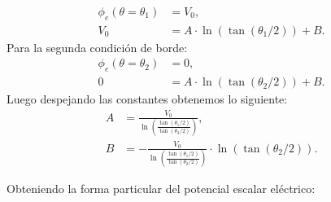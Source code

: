 \documentclass[
  11pt,
  letterpaper,
   addpoints,
   answers
  ]{exam}
\begin{document}
\begin{questions}
\begin{solution}
\begin{enumerate}
\begin{equation}
            \begin{aligned}
                \phi_{e}(\theta = \theta_{1}) &= V_{0}, \\
                V_{0} &= A \cdot \ln\left(\tan(\theta_{1}/2)\right) + B.
            \end{aligned}
        \end{equation}
        Para la segunda condición de borde:
        \begin{equation}
            \begin{aligned}
                \phi_{e}(\theta = \theta_{2}) &= 0, \\
                0 &= A\cdot \ln\left(\tan(\theta_{2}/2)\right) + B.
            \end{aligned}
        \end{equation}
        Luego despejando las constantes obtenemos lo siguiente:
        \begin{equation}
            \begin{aligned}
                A &= \frac{V_{0}}{\ln\left(\frac{\tan(\theta_{1}/2)}{\tan(\theta_{2}/2)}\right)}, \\
                B &=  -\frac{V_{0}}{\ln\left(\frac{\tan(\theta_{1}/2)}{\tan(\theta_{2}/2)}\right)} \cdot \ln\left(\tan(\theta_{2}/2)\right).
            \end{aligned}
        \end{equation}
        
        Obteniendo la forma particular del potencial escalar eléctrico:
        

\end{enumerate}
\end{solution}
\end{questions}
\end{document}
